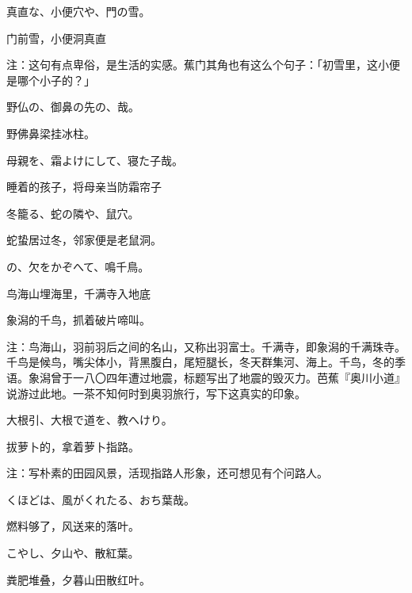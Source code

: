 \begin{haiku}
    {\FH 真直な、小便穴や、門の雪。}

    {\FK 门前雪，小便洞真直}

    {\FT 注：这句有点卑俗，是生活的实感。蕉门其角也有这么个句子：「初雪里，这小便是哪个小子的？」}
\end{haiku}

\begin{haiku}
    {\FH 野仏の、御鼻の先の、哉。}

    {\FK 野佛鼻梁挂冰柱。}
\end{haiku}

\begin{haiku}
    {\FH 母親を、霜よけにして、寝た子哉。}

    {\FK 睡着的孩子，将母亲当防霜帘子}
\end{haiku}

\begin{haiku}
    {\FH 冬籠る、蛇の隣や、鼠穴。}

    {\FK 蛇蛰居过冬，邻家便是老鼠洞。}
\end{haiku}

\begin{haiku}
    {\FH {}の、欠をかぞへて、鳴千鳥。}

    {\FK 鸟海山埋海里，千满寺入地底}

    {\FK 象潟的千鸟，抓着破片啼叫。}

    {\FT 注：鸟海山，羽前羽后之间的名山，又称出羽富士。千满寺，即象潟的千满珠寺。千鸟是候鸟，嘴尖体小，背黑腹白，尾短腿长，冬天群集河、海上。千鸟，冬的季语。象潟曾于一八〇四年遭过地震，标题写出了地震的毁灭力。芭蕉『奥川小道』说游过此地。一茶不知何时到奥羽旅行，写下这真实的印象。}
\end{haiku}

\begin{haiku}
    {\FH 大根引、大根で道を、教へけり。}

    {\FK 拔萝卜的，拿着萝卜指路。}

    {\FT 注：写朴素的田园风景，活现指路人形象，还可想见有个问路人。}
\end{haiku}

\begin{haiku}
    {\FH {}くほどは、風がくれたる、おち葉哉。}

    {\FK 燃料够了，风送来的落叶。}
\end{haiku}

\begin{haiku}
    {\FH こやし、夕山や、散紅葉。}

    {\FK 粪肥堆叠，夕暮山田散红叶。}
\end{haiku}

